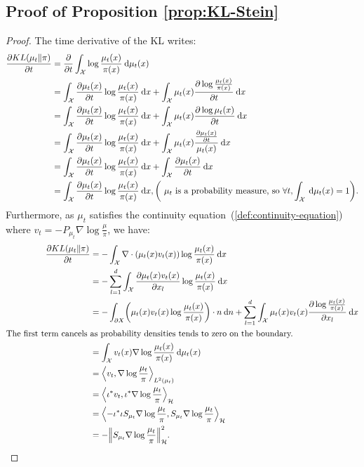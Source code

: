 \documentclass{article}
\newcommand{\X}{\mathcal{X}}
\renewcommand{\H}{\mathcal{H}}
\newcommand{\diff}[2]{\frac{\partial #1}{\partial #2}}
\renewcommand{\d}{\: \mathrm{d}}
\DeclarePairedDelimiter{\norm}{\|}{\|}
\DeclarePairedDelimiter{\pare}{(}{)}
\DeclarePairedDelimiter{\sca}{\langle}{\rangle}
\begin{document}
\subsection{Proof of Proposition \ref{prop:KL-Stein}}\label{pro:KL-Stein}
\begin{proof}
  The time derivative of the KL writes:
  \begin{align*}
    \diff{KL(\mu_t \| \pi)}{t} &= \diff{ }{t} \int_\X \log \frac{\mu_t(x)}{\pi(x)} \d \mu_t(x) \\
    &= \int_\X \diff{\mu_t(x)}{t} \log \frac{\mu_t(x)}{\pi(x)} \d x
      + \int_\X \mu_t(x) \diff{\log \frac{\mu_t(x)}{\pi(x)}}{t} \d x \\
    &= \int_\X \diff{\mu_t(x)}{t} \log \frac{\mu_t(x)}{\pi(x)} \d x
      + \int_\X \mu_t(x) \diff{\log \mu_t(x)}{t} \d x \\
    &= \int_\X \diff{\mu_t(x)}{t} \log \frac{\mu_t(x)}{\pi(x)} \d x
      + \int_\X \mu_t(x) \frac{\diff{\mu_t(x)}{t}}{\mu_t(x)} \d x \\
    &= \int_\X \diff{\mu_t(x)}{t} \log \frac{\mu_t(x)}{\pi(x)} \d x
      + \int_\X \diff{\mu_t(x)}{t} \d x \\
    &= \int_\X \diff{\mu_t(x)}{t} \log \frac{\mu_t(x)}{\pi(x)} \d x
   , \pare*{\text{ $\mu_t$ is a probability measure, so } \forall t, \int_\X \d \mu_t(x) = 1}.
  \end{align*}
  Furthermore, as $\mu_t$ satisfies the continuity equation~(\ref{def:continuity-equation})
  where $v_t = -P_{\mu_t} \nabla \log \frac{\mu}{\pi}$, we have:
  \begin{align*}
    \diff{KL(\mu_t \| \pi)}{t} &= -\int_\X \nabla \cdot (\mu_t(x) v_t(x)) \log \frac{\mu_t(x)}{\pi(x)} \d x \\
    &= -\sum_{l=1}^d \int_\X \diff{\mu_t(x) v_t(x)}{x_l} \log \frac{\mu_t(x)}{\pi(x)} \d x \\
    &= -\int_{\partial X} \pare* {\mu_t(x) v_t(x) \log \frac{\mu_t(x)}{\pi(x)}} \cdot n \d n
      + \sum_{l=1}^d \int_\X \mu_t(x) v_t(x) \diff{\log \frac{\mu_t(x)}{\pi(x)}}{x_l} \d x \\
    \text{The first term cancels }& \text{as probability densities tends to zero on the boundary.} \\
    &= \int_\X v_t(x) \nabla \log \frac{\mu_t(x)}{\pi(x)} \d \mu_t(x) \\
    &= \sca*{v_t, \nabla \log \frac{\mu_t}{\pi}}_{L^2(\mu_t)} \\
    &= \sca*{\iota^* v_t, \iota^* \nabla \log \frac{\mu_t}{\pi}}_{\H} \\
    &= \sca*{-\iota^* \iota S_{\mu_t} \nabla \log \frac{\mu_t}{\pi}, S_{\mu_t} \nabla \log \frac{\mu_t}{\pi}}_{\H} \\
    &= -\norm*{S_{\mu_t} \nabla \log \frac{\mu_t}{\pi}}_\H^2.
  \end{align*}
\end{proof}
\end{document}
